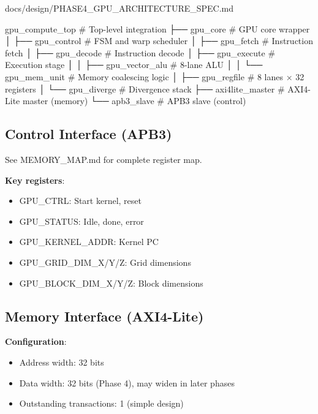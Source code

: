 \begin{relocated}{docs/design/PHASE4_GPU_ARCHITECTURE_SPEC.md}
\begin{textblock}
gpu_compute_top                 # Top-level integration
├── gpu_core                    # GPU core wrapper
│   ├── gpu_control             # FSM and warp scheduler
│   ├── gpu_fetch               # Instruction fetch
│   ├── gpu_decode              # Instruction decode
│   ├── gpu_execute             # Execution stage
│   │   ├── gpu_vector_alu      # 8-lane ALU
│   │   └── gpu_mem_unit        # Memory coalescing logic
│   ├── gpu_regfile             # 8 lanes × 32 registers
│   └── gpu_diverge             # Divergence stack
├── axi4lite_master             # AXI4-Lite master (memory)
└── apb3_slave                  # APB3 slave (control)
\end{textblock}

\subsection{Control Interface (APB3)}\label{ds:ch:phase4-gpu-architecture:control-interface-apb3}

See MEMORY\_\allowbreak{}MAP.md for complete register map.

\textbf{Key registers}:

\begin{itemize}
\tightlist
\item
  GPU\_CTRL: Start kernel, reset
\item
  GPU\_\allowbreak{}STATUS: Idle, done, error
\item
  GPU\_\allowbreak{}KERNEL\_\allowbreak{}ADDR: Kernel PC
\item
  GPU\_\allowbreak{}GRID\_\allowbreak{}DIM\_\allowbreak{}X/\allowbreak{}Y/\allowbreak{}Z:
  Grid dimensions
\item
  GPU\_\allowbreak{}BLOCK\_\allowbreak{}DIM\_\allowbreak{}X/\allowbreak{}Y/\allowbreak{}Z:
  Block dimensions
\end{itemize}

\subsection{Memory Interface (AXI4-Lite)}\label{ds:ch:phase4-gpu-architecture:memory-interface-axi4-lite}

\textbf{Configuration}:

\begin{itemize}
\tightlist
\item
  Address width: 32 bits
\item
  Data width: 32 bits (Phase 4), may widen in later phases
\item
  Outstanding transactions: 1 (simple design)
\end{itemize}


\end{relocated}

